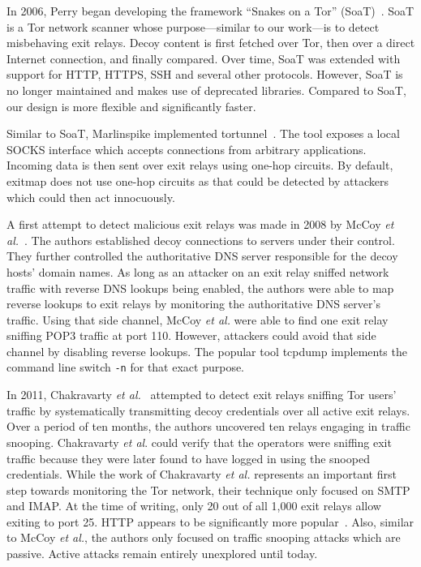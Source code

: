 \documentclass[letterpaper,twocolumn,10pt]{article}
\begin{document}
In 2006, Perry began developing the framework ``Snakes on a Tor'' (\textsf{SoaT})~\cite{soat}.
\textsf{SoaT} is a Tor network scanner whose purpose---similar to our work---is to detect
misbehaving exit relays.  Decoy content is first fetched over Tor, then over a direct Internet
connection, and finally compared.  Over time, \textsf{SoaT} was extended with support for HTTP,
HTTPS, SSH and several other protocols.  However, \textsf{SoaT} is no longer maintained and makes
use of deprecated libraries.  Compared to \textsf{SoaT}, our design is more flexible and
significantly faster.

Similar to \textsf{SoaT}, Marlinspike implemented \textsf{tortunnel}~\cite{tortunnel}.  The tool
exposes a local SOCKS interface which accepts connections from arbitrary applications.  Incoming
data is then sent over exit relays using one-hop circuits.  By default, \textsf{exitmap} does not
use one-hop circuits as that could be detected by attackers which could then act innocuously.

A first attempt to detect malicious exit relays was made in 2008 by McCoy \emph{et
al.}~\cite{McCoy2008}.  The authors established decoy connections to servers under their control.
They further controlled the authoritative DNS server responsible for the decoy hosts' domain names.
As long as an attacker on an exit relay sniffed network traffic with reverse DNS lookups being
enabled, the authors were able to map reverse lookups to exit relays by monitoring the authoritative
DNS server's traffic.  Using that side channel, McCoy \emph{et al.} were able to find one exit relay
sniffing POP3 traffic at port 110.  However, attackers could avoid that side channel by disabling
reverse lookups.  The popular tool \textsf{tcpdump} implements the command line switch \texttt{-n}
for that exact purpose.

In 2011, Chakravarty \emph{et al.}~\cite{Chakravarty2011} attempted to detect exit relays sniffing
Tor users' traffic by systematically transmitting decoy credentials over all active exit relays.
Over a period of ten months, the authors uncovered ten relays engaging in traffic snooping.
Chakravarty \emph{et al}. could verify that the operators were sniffing exit traffic because they
were later found to have logged in using the snooped credentials.  While the work of Chakravarty
\emph{et al.} represents an important first step towards monitoring the Tor network, their technique
only focused on SMTP and IMAP.  At the time of writing, only 20 out of all 1,000 exit relays
allow exiting to port 25.  HTTP appears to be significantly more popular~\cite{McCoy2008,Huber2010}.
Also, similar to McCoy \emph{et al.}, the authors only focused on traffic snooping attacks which are
passive.  Active attacks remain entirely unexplored until today.
\end{document}
